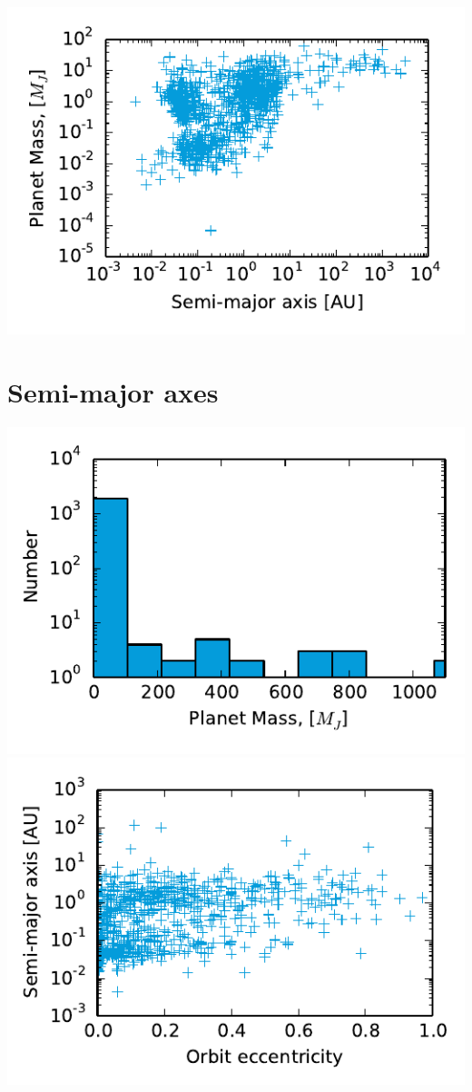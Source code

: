 \includegraphics{figures/semimass.pdf}

\section{Semi-major axes}
\label{sec:semi-major-axes}

\includegraphics{figures/axishist.pdf}
\includegraphics{figures/eccsemi.pdf}


